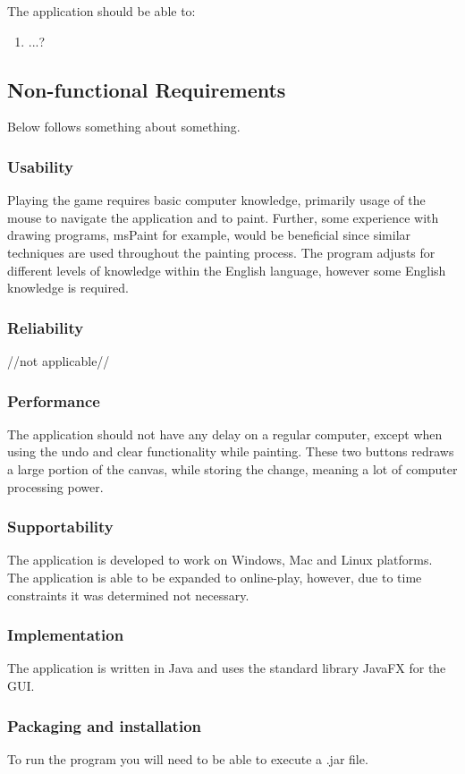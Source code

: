 \documentclass[12pt,a4paper]{scrartcl}
\begin{document}
The application should be able to:
\begin{enumerate}
    \item ...?
\end{enumerate}

\subsection{Non-functional Requirements}
Below follows something about something.
\subsubsection{Usability}
Playing the game requires basic computer knowledge, primarily usage of the mouse to navigate the application and to paint. Further, some experience with drawing programs, msPaint for example, would be beneficial since similar techniques are used throughout the painting process. The program adjusts for different levels of knowledge within the English language, however some English knowledge is required. 
\subsubsection{Reliability}
//not applicable//
\subsubsection{Performance}
The application should not have any delay on a regular computer, except when using the undo and clear functionality while painting. These two buttons redraws a large portion of the canvas, while storing the change, meaning a lot of computer processing power.
\subsubsection{Supportability}
The application is developed to work on Windows, Mac and Linux platforms. The application is able to be expanded to online-play, however, due to time constraints it was determined not necessary. 
\subsubsection{Implementation}
The application is written in Java and uses the standard library JavaFX for the GUI.
\subsubsection{Packaging and installation}
To run the program you will need to be able to execute a .jar file.
\end{document}
